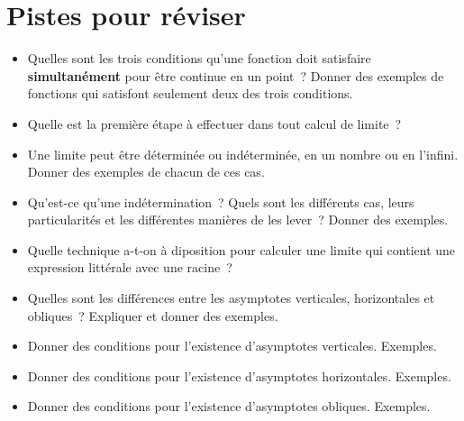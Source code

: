 \documentclass[a4paper,12pt]{article}
\begin{document}
\section{Pistes pour réviser}
\begin{itemize}
	\item Quelles sont les trois conditions qu'une fonction doit satisfaire {\bfseries simultanément} pour être continue en un point~? Donner des exemples de fonctions qui satisfont seulement deux des trois conditions.
	\item Quelle est la première étape à effectuer dans tout calcul de limite~?
	\item Une limite peut être déterminée ou indéterminée, en un nombre ou en l'infini. Donner des exemples de chacun de ces cas. 
	\item Qu'est-ce qu'une indétermination~? Quels sont les différents cas, leurs particularités et les différentes manières de les lever~? Donner des exemples.
	\item Quelle technique a-t-on à diposition pour calculer une limite qui contient une expression littérale avec une racine~?
	\item Quelles sont les différences entre les asymptotes verticales, horizontales et obliques~? Expliquer et donner des exemples.
	\item Donner des conditions pour l'existence d'asymptotes verticales. Exemples. 
	\item Donner des conditions pour l'existence d'asymptotes horizontales. Exemples.
	\item Donner des conditions pour l'existence d'asymptotes obliques. Exemples.
\end{itemize}
 \nocite{*}
 \vspace{-10pt}
 \printbibliography[prenote=myprenote,title={Sources du cours}] 
\end{document}
